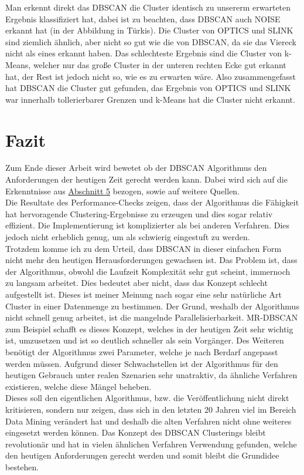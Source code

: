 \documentclass{lni}
\begin{document}
Man erkennt direkt das DBSCAN die Cluster identisch zu unsererm erwarteten Ergebnis klassifiziert hat, dabei ist zu beachten, dass DBSCAN auch NOISE erkannt hat (in der Abbildung in Türkis). Die Cluster von OPTICS und SLINK sind ziemlich ähnlich, aber nicht so gut wie die von DBSCAN, da sie das Viereck nicht als eines erkannt haben. Das schlechteste Ergebnis sind die Cluster von k-Means, welcher nur das große Cluster in der unteren rechten Ecke gut erkannt hat, der Rest ist jedoch nicht so, wie es zu erwarten wäre.
Also zusammengefasst hat DBSCAN die Cluster gut gefunden, das Ergebnis von OPTICS und SLINK war innerhalb tollerierbarer Grenzen und k-Means hat die Cluster nicht erkannt.

%
%

\section{Fazit}
\label{sec:fazit}
Zum Ende dieser Arbeit wird bewetet ob der DBSCAN Algorithmus den Anforderungen der heutigen Zeit gerecht werden kann. Dabei wird sich auf die Erkenntnisse aus \hyperref[sec:perf]{Abschnitt 5} bezogen, sowie auf weitere Quellen.\\
Die Resultate des Performance-Checks zeigen, dass der Algorithmus die Fähigkeit hat hervoragende Clustering-Ergebnisse zu erzeugen und dies sogar relativ effizient. Die Implementierung ist komplizierter als bei anderen Verfahren. Dies jedoch nicht erheblich genug, um als schwierig eingestuft zu werden.\\
Trotzdem komme ich zu dem Urteil, dass DBSCAN in dieser einfachen Form nicht mehr den heutigen Herausforderungen gewachsen ist. Das Problem ist, dass der Algorithmus, obwohl die Laufzeit Komplexität sehr gut scheint, immernoch zu langsam arbeitet. Dies bedeutet aber nicht, dass das Konzept schlecht aufgestellt ist. Dieses ist meiner Meinung nach sogar eine sehr natürliche Art Cluster in einer Datenmenge zu bestimmen. Der Grund, weshalb der Algorithmus nicht schnell genug arbeitet, ist die mangelnde Parallelisierbarkeit. MR-DBSCAN \cite{PARALLEL} zum Beispiel schafft es dieses Konzept, welches  in der heutigen Zeit sehr wichtig ist, umzusetzen und ist so deutlich schneller als sein Vorgänger. Des Weiteren benötigt der Algorithmus zwei Parameter, welche je nach Berdarf angepasst werden müssen. Aufgrund dieser Schwachstellen ist der Algorithmus für den heutigen Gebrauch unter realen Szenarien sehr unatraktiv, da ähnliche Verfahren \cite{PPF} existieren, welche diese Mängel beheben.\\
Dieses soll den eigentlichen Algorithmus, bzw. die Veröffentlichung nicht direkt kritisieren, sondern nur zeigen, dass sich in den letzten 20 Jahren viel im Bereich Data Mining verändert hat und deshalb die alten Verfahren nicht ohne weiteres eingesetzt werden können. Das Konzept des DBSCAN Clusterings bleibt revolutionär und hat in vielen ähnlichen Verfahren Verwendung gefunden, welche den heutigen Anforderungen gerecht werden und somit bleibt die Grundidee bestehen.


\end{document}
